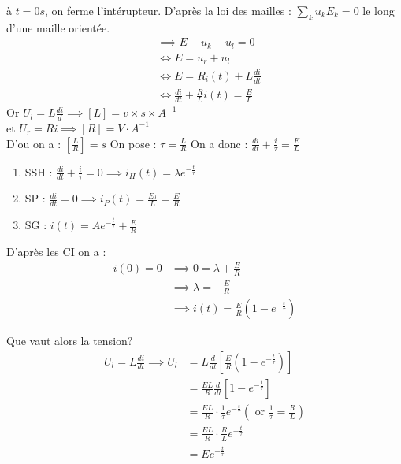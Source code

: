 à \(t=0s\), on ferme l'intérupteur. D'après la loi des mailles : \(\sum_{k} u_{k}E_{k} = 0 \) le long d'une maille orientée.
\begin{align}
    & \implies E-u_{k}-u_{l} =0 \\ 
    & \iff E = u_{r}+u_{l}\\
    & \iff E = R_{i}(t) + L \frac{di}{dt}\\
    & \iff \frac{di}{dt} + \frac{R}{L} i(t) = \frac{E}{L}
\end{align} 
Or \(U_{l} = L \frac{di}{d} \implies \left[ L \right] = v \times s \times A^{-1}\)\\
et \(U_{r} = Ri \implies \left[ R \right] = V \cdot  A^{-1}\)\\
D'ou on a : \(\left[ \frac{L}{R} \right] = s\)
On pose : \(\tau  = \frac{L}{R}\) 
On a donc : \(\frac{di}{dt}+ \frac{i}{\tau} = \frac{E}{L}\)  
\begin{enumerate}
    \item SSH : \(\frac{di}{dt}+ \frac{i}{\tau} = 0 \implies i_{H}(t) = \lambda e^{-\frac{t}{\tau}}\) 
    \item SP : \(\frac{di}{dt} = 0 \implies i_{P}(t) = \frac{E \tau }{L} = \frac{E}{R}\)
    \item SG : \(i(t) = Ae^{-\frac{t}{\tau}}+\frac{E}{R}\)  
\end{enumerate}   
D'après les CI on a : 
\begin{align}
    i(0) = 0 &\implies 0 = \lambda +\frac{E}{R}\\
    & \implies \lambda  = -\frac{E}{R} \\
    & \implies i(t) = \frac{E}{R}(1-e^{-\frac{t}{\tau }}) 
\end{align}

\begin{center}
\end{center}

Que vaut alors la tension? 
\begin{eqnarray*}
    U_{l} = L \frac{di}{dt} \implies U_{l} &= L \frac{d}{dt} \left[ \frac{E}{R}(1-e^{-\frac{t}{\tau}}) \right] \\
    &= \frac{EL}{R} \frac{d}{dt} \left[ 1-e^{-\frac{t}{\tau}} \right]\\
    &= \frac{EL}{R} \cdot \frac{1}{\tau} e^{-\frac{t}{\tau}} (\text{ or } \frac{1}{\tau} = \frac{R}{L})\\
    &= \frac{EL}{R} \cdot \frac{R}{L} e^{-\frac{t}{\tau}}\\
    &= Ee^{-\frac{t}{\tau }}
\end{eqnarray*}

